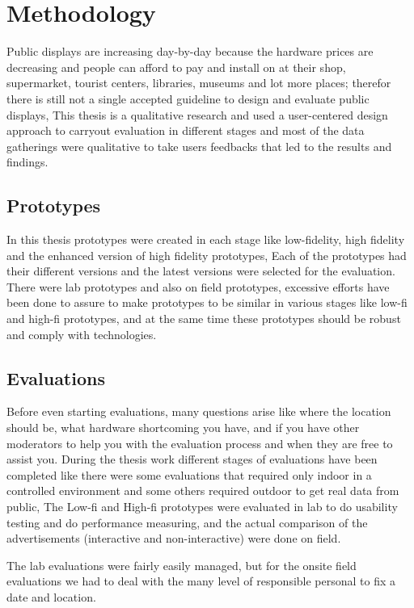 \section{Methodology}
Public displays are increasing day-by-day because the hardware prices are decreasing and people can afford to pay and install on at their shop, supermarket, tourist centers, libraries, museums and lot more places; therefor there is still not a single accepted guideline to design and evaluate public displays, This thesis is a qualitative research and used a user-centered design approach to carryout evaluation in different stages and most of the data gatherings were qualitative to take users feedbacks that led to the results and findings.


\subsection{Prototypes}
In this thesis prototypes were created in each stage like low-fidelity, high fidelity and the enhanced version of high fidelity prototypes, Each of the prototypes had their different versions and the latest versions were selected for the evaluation. There were lab prototypes and also on field prototypes, excessive efforts have been done to assure to make prototypes to be similar in various stages like low-fi and high-fi prototypes, and at the same time these prototypes should be robust and comply with technologies.  


\subsection{Evaluations}
Before even starting evaluations, many questions arise like where the location should be, what hardware shortcoming you have, and if you have other moderators to help you with the evaluation process and when they are free to assist you. During the thesis work different stages of evaluations have been completed like there were some evaluations that required only indoor in a controlled environment and some others required outdoor to get real data from public, The Low-fi and High-fi prototypes were evaluated in lab to do usability testing and do performance measuring, and the actual comparison of the advertisements (interactive and non-interactive) were done on field. 

The lab evaluations were fairly easily managed, but for the onsite field evaluations we had to deal with the many level of responsible personal to fix a date and location. 

